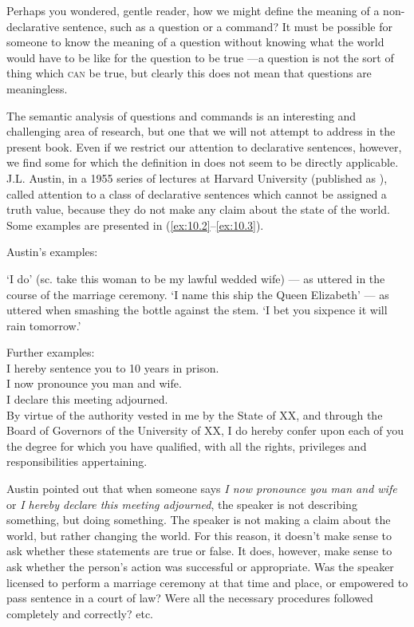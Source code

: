 Perhaps you wondered, gentle reader, how we might define the meaning of a non-declarative sentence, such as a question or a command? It must be possible for someone to know the meaning of a question without knowing what the world would have to be like for the question to be true —a question is not the sort of thing which \textsc{can} be true, but clearly this does not mean that questions are meaningless.



The semantic analysis of questions and commands is an interesting and challenging area of research, but one that we will not attempt to address in the present book. Even if we restrict our attention to declarative sentences, however, we find some for which the definition in  does not seem to be directly applicable. J.L. Austin, in a 1955 series of lectures at Harvard University (published as \citealt{Austin1962}), called attention to a class of declarative sentences which cannot be assigned a truth value, because they do not make any claim about the state of the world. Some examples are presented in (\ref{ex:10.2}--\ref{ex:10.3}).


Austin’s examples:

\ea \label{ex:10.2}
\ea  ‘I do’ (sc. take this woman to be my lawful wedded wife) — as uttered in the course of the marriage ceremony.
\ex  ‘I name this ship the Queen Elizabeth’ — as uttered when smashing the bottle against the stem.
\ex   ‘I bet you sixpence it will rain tomorrow.’
\z \z

\ea \label{ex:10.3}
Further examples:\\
\ea I hereby sentence you to 10 years in prison.\\
\ex I now pronounce you man and wife.\\
\ex I declare this meeting adjourned.\\
\ex By virtue of the authority vested in me by the State of XX, and through the Board of Governors of the University of XX, I do hereby confer upon each of you the degree for which you have qualified, with all the rights, privileges and responsibilities appertaining.
\z
\z


Austin pointed out that when someone says \textit{I now pronounce you man and wife} or \textit{I hereby declare this meeting adjourned}, the speaker is not describing something, but doing something. The speaker is not making a claim about the world, but rather changing the world. For this reason, it doesn’t make sense to ask whether these statements are true or false. It does, however, make sense to ask whether the person’s action was successful or appropriate. Was the speaker licensed to perform a marriage ceremony at that time and place, or empowered to pass sentence in a court of law? Were all the necessary procedures followed completely and correctly? etc.




